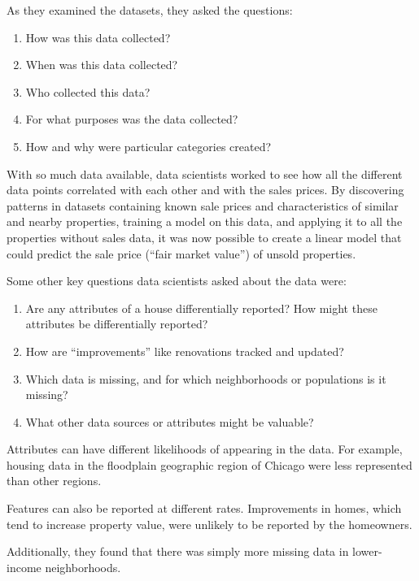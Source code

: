 \documentclass[
  letterpaper,
  DIV=11,
  numbers=noendperiod]{scrreprt}
\providecommand{\tightlist}{%
  \setlength{\itemsep}{0pt}\setlength{\parskip}{0pt}}\usepackage{longtable,booktabs,array}
\begin{document}
As they examined the datasets, they asked the questions:

\begin{enumerate}
\def\labelenumi{\arabic{enumi}.}
\tightlist
\item
  How was this data collected?
\item
  When was this data collected?
\item
  Who collected this data?
\item
  For what purposes was the data collected?
\item
  How and why were particular categories created?
\end{enumerate}

With so much data available, data scientists worked to see how all the
different data points correlated with each other and with the sales
prices. By discovering patterns in datasets containing known sale prices
and characteristics of similar and nearby properties, training a model
on this data, and applying it to all the properties without sales data,
it was now possible to create a linear model that could predict the sale
price (``fair market value'') of unsold properties.

Some other key questions data scientists asked about the data were:

\begin{enumerate}
\def\labelenumi{\arabic{enumi}.}
\tightlist
\item
  Are any attributes of a house differentially reported? How might these
  attributes be differentially reported?
\item
  How are ``improvements'' like renovations tracked and updated?
\item
  Which data is missing, and for which neighborhoods or populations is
  it missing?
\item
  What other data sources or attributes might be valuable?
\end{enumerate}

Attributes can have different likelihoods of appearing in the data. For
example, housing data in the floodplain geographic region of Chicago
were less represented than other regions.

Features can also be reported at different rates. Improvements in homes,
which tend to increase property value, were unlikely to be reported by
the homeowners.

Additionally, they found that there was simply more missing data in
lower-income neighborhoods.
\end{document}
